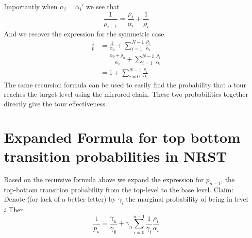 \documentclass{article}
\begin{document}
Importantly when $\alpha_i=\alpha_i'$ we see that
\[ \frac{1}{\rho_{i+1}} = \frac{\rho_i}{\alpha_i}+\frac{1}{\rho_i} \]
And we recover the expression for the symmetric case. 
\begin{align*}
    \frac{1}{p} &= \frac{1}{\alpha_0} + \sum_{i=1}^{N-1} \frac{\rho_i}{\alpha_i} \\
    &= \frac{\alpha_0+\rho_0}{\alpha_0} +  \sum_{i=1}^{N-1} \frac{\rho_i}{\alpha_i} \\
    &= 1+ \sum_{i=0}^{N-1} \frac{\rho_i}{\alpha_i}
\end{align*} 
The same recursion formula can be used to easily find the probability that a
tour reaches the target level using the mirrored chain. These two probabilities
together directly give the tour effectiveness.

\section{Expanded Formula for top bottom transition probabilities in NRST}
Based on the recursive formula above we expand the expression for $p_{n-1}$, the
top-bottom transition probability from the top-level to the base level. Claim:
Denote (for lack of a better letter) by $\gamma_i$ the marginal probability of being
in level $i$ Then
\[ \frac{1}{p_{n}} = \frac{\gamma_n}{\gamma_0} + \gamma_{n}\sum_{i=0}^{n-1}
\frac{1}{\gamma_i}\frac{\rho_i}{\alpha_i} \]
\end{document}
